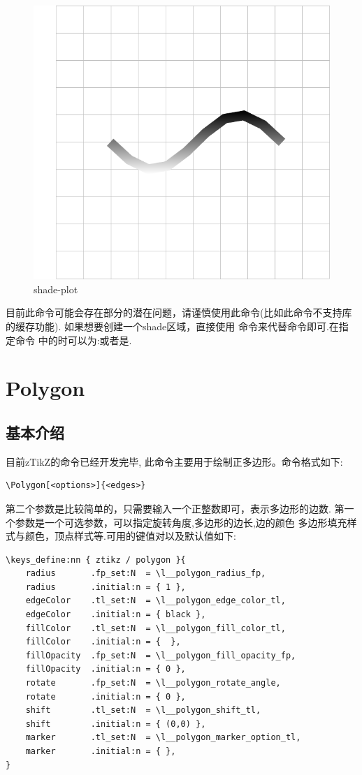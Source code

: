 \begin{figure}[!htb]
    \centering
    \includegraphics[width=.75\linewidth]{./pics/ztikz_example_5.pdf}
    \caption{shade-plot}
    \label{fig:shade-plot}
\end{figure}

\begin{remark}
目前此命令可能会存在部分的潜在问题，请谨慎使用此命令(比如此命令不支持库的缓存功能). 
如果想要创建一个shade区域，直接使用 \cmd{\shade}命令来代替\cmd{\fill}命令即可.在指定命令
中的时可以为:或者是.
\end{remark}


\section{Polygon}
\subsection{基本介绍}
目前zTikZ的命令已经开发完毕, 此命令主要用于绘制正多边形。命令格式如下:
\begin{verbatim}
\Polygon[<options>]{<edges>}
\end{verbatim}

第二个参数是比较简单的，只需要输入一个正整数即可，表示多边形的边数. 第一个参数是一个可选参数，可以指定旋转角度,多边形的边长,边的颜色
多边形填充样式与颜色，顶点样式等.可用的键值对以及默认值如下:

\begin{verbatim}
\keys_define:nn { ztikz / polygon }{
    radius       .fp_set:N  = \l__polygon_radius_fp,
    radius       .initial:n = { 1 },
    edgeColor    .tl_set:N  = \l__polygon_edge_color_tl,
    edgeColor    .initial:n = { black },
    fillColor    .tl_set:N  = \l__polygon_fill_color_tl,
    fillColor    .initial:n = {  },
    fillOpacity  .fp_set:N  = \l__polygon_fill_opacity_fp,
    fillOpacity  .initial:n = { 0 },
    rotate       .fp_set:N  = \l__polygon_rotate_angle,
    rotate       .initial:n = { 0 },
    shift        .tl_set:N  = \l__polygon_shift_tl,
    shift        .initial:n = { (0,0) },
    marker       .tl_set:N  = \l__polygon_marker_option_tl,
    marker       .initial:n = { },
}
\end{verbatim}

